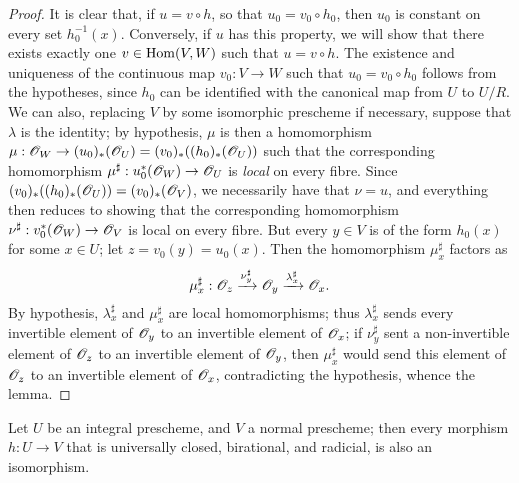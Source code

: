 \begin{proof}
\label{proof-2.8.11.1}
It is clear that, if $u=v\circ h$, so that $u_0=v_0\circ h_0$, then $u_0$ is constant on every set $h_0^{-1}(x)$.
Conversely, if $u$ has this property, we will show that there exists exactly one $v\in\operatorname{Hom}(V,W)$ such that $u=v\circ h$.
The existence and uniqueness of the continuous map $v_0:V\to W$ such that $u_0=v_0\circ h_0$ follows from the hypotheses, since $h_0$ can be identified with the canonical map from $U$ to $U/R$.
We can also, replacing $V$ by some isomorphic prescheme if necessary, suppose that $\lambda$ is the identity;
by hypothesis, $\mu$ is then a homomorphism $\mu:\sh{O}_W\to(u_0)_*(\sh{O}_U) = (v_0)_*((h_0)_*(\sh{O}_U))$ such that the corresponding homomorphism $\mu^\sharp:u_0^*(\sh{O}_W)\to\sh{O}_U$ is \emph{local} on every fibre.
Since $(v_0)_*((h_0)_*(\mathscr{O}_U))=(v_0)_*(\mathscr{O}_V)$, we necessarily have that $\nu=u$, and everything then reduces to showing that the corresponding homomorphism $\nu^\sharp:v_0^*(\sh{O}_W)\to\sh{O}_V$ is local on every fibre.
But every $y\in V$ is of the form $h_0(x)$ for some $x\in U$;
let $z=v_0(y)=u_0(x)$.
Then  the homomorphism $\mu_x^\sharp$ factors as
\[
    \mu_x^\sharp: \mathscr{O}_z \xrightarrow{\nu_y^\sharp} \mathscr{O}_y \xrightarrow{\lambda_x^\sharp} \mathscr{O}_x.
\]
By hypothesis, $\lambda_x^\sharp$ and $\mu_x^\sharp$ are local homomorphisms;
thus $\lambda_x^\sharp$ sends every invertible element of $\mathscr{O}_y$ to an invertible element of $\mathscr{O}_x$;
if $\nu_y^\sharp$ sent a non-invertible element of $\mathscr{O}_z$ to an invertible element of $\mathscr{O}_y$, then $\mu_x^\sharp$ would send this element of $\mathscr{O}_z$ to an invertible element of $\mathscr{O}_x$, contradicting the hypothesis, whence the lemma.
\end{proof}

\begin{corollary}[8.11.2]
\label{II.8.11.2}
Let $U$ be an integral prescheme, and $V$ a normal prescheme;
then every morphism $h:U\to V$ that is universally closed, birational, and radicial, is also an isomorphism.
\end{corollary}

